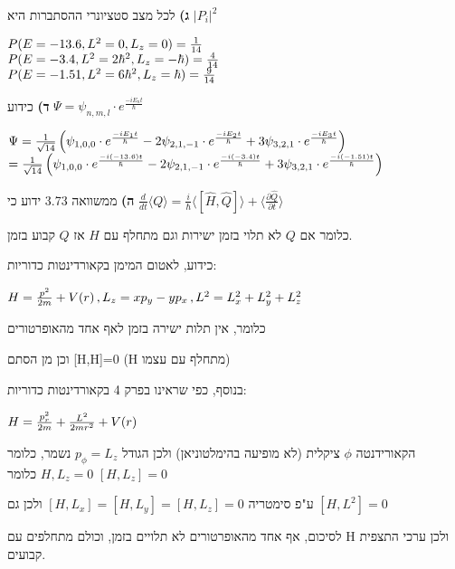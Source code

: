 \documentclass[14pt]{extarticle}
\makeatletter
\newenvironment{lefteqs}{%
    \begin{english}%
    \begin{flushleft}%
    \renewcommand{\arraystretch}{1.3}%
    $\begin{array}{@{}l@{}}%
}{%
    \end{array}$%
    \end{flushleft}%
    \end{english}%
}
\makeatother
\begin{document}
\textbf{ג)}
לכל מצב סטציונרי ההסתברות היא $|P_i|^2$

\begin{lefteqs}
    P({E=-13.6, L^2=0, L_z=0}) = \frac{1}{14} \\
    P({E=-3.4, L^2=2\hbar^2, L_z=-\hbar}) = \frac{4}{14} \\
    P({E=-1.51, L^2=6\hbar^2, L_z=\hbar}) = \frac{9}{14}
\end{lefteqs}

\textbf{ד)}
כידוע $\Psi = \psi_{n,m,l} \cdot e^{\frac{-i E_n t}{\hbar}}$

\begin{lefteqs}
    \Psi = \frac{1}{\sqrt{14}} \left( \psi_{1,0,0} \cdot e^{\frac{-i E_1 t}{\hbar}} - 2 \psi_{2,1,-1} \cdot e^{\frac{-i E_2 t}{\hbar}} + 3 \psi_{3,2,1} \cdot e^{\frac{-i E_3 t}{\hbar}} \right) \\
    = \frac{1}{\sqrt{14}} \left( \psi_{1,0,0} \cdot e^{\frac{-i (-13.6) t}{\hbar}} - 2 \psi_{2,1,-1} \cdot e^{\frac{-i (-3.4) t}{\hbar}} + 3 \psi_{3,2,1} \cdot e^{\frac{-i (-1.51) t}{\hbar}} \right)
\end{lefteqs}

\textbf{ה)}
ממשוואה 3.73 ידוע כי $\frac{d}{dt} \langle Q \rangle = \frac{i}{\hbar} \langle [\hat{H},\hat{Q}] \rangle + \langle \frac{\partial \hat{Q}}{\partial t} \rangle $

כלומר אם $Q$ לא תלוי בזמן ישירות וגם מתחלף עם $H$ אז $Q$ קבוע בזמן.

כידוע, לאטום המימן בקאורדינטות כדוריות:
\begin{lefteqs}
    H = \frac{p^2}{2m} + V(r) \, , L_z = xp_y - yp_x \, , L^2 = L_x^2 + L_y^2 + L_z^2
\end{lefteqs}

כלומר, אין תלות ישירה בזמן לאף אחד מהאופרטורים

וכן מן הסתם [H,H]=0 (H מתחלף עם עצמו)

בנוסף, כפי שראינו בפרק 4 בקאורדינטות כדוריות:

\begin{lefteqs}
    H = \frac{p_r^2}{2m} + \frac{L^2}{2mr^2} + V(r) \\
\end{lefteqs}

הקאורידנטה $\phi$ ציקלית (לא מופיעה בהימלטוניאן) ולכן הגודל $p_\phi=L_z$ נשמר,
כלומר ${H,L_z}=0$ כלומר $[H,L_z]=0$

ע"פ סימטריה $[H,L_x]=[H,L_y]=[H,L_z]=0$ ולכן גם $[H, L^2]=0$

לסיכום, אף אחד מהאופרטורים לא תלויים בזמן, וכולם מתחלפים עם H ולכן ערכי התצפית קבועים.
\end{document}
